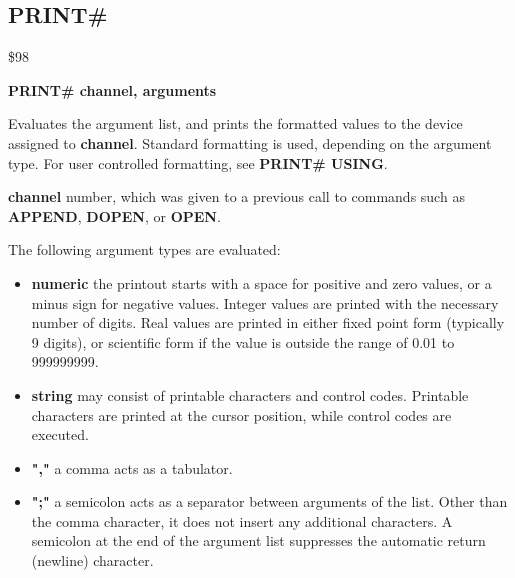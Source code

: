 
\newpage
\subsection{PRINT\#}
\begin{description}[leftmargin=2cm,style=nextline]
\item [Token:] \$98
\item [Format:] {\bf PRINT\# channel, arguments}
\item [Usage:]  Evaluates the argument list, and prints the formatted
                values to the device assigned to {\bf channel}.
                Standard formatting is used, depending on the
                argument type. For user controlled formatting,
                see {\bf PRINT\# USING}.

                {\bf channel} number, which was given to a previous
                call to commands such as {\bf APPEND}, {\bf DOPEN}, or {\bf OPEN}.

                The following argument types are evaluated:
                \begin{itemize}
                    \item {\bf numeric} the printout starts with a space
                    for positive and zero values, or a minus sign for
                    negative values. Integer values are printed with
                    the necessary number of digits. Real values are
                    printed in either fixed point form (typically
                    9 digits), or scientific form if the value is
                    outside the range of 0.01 to 999999999.

                    \item {\bf string} may consist of printable
                    characters and control codes. Printable characters
                    are printed at the cursor position, while control
                    codes are executed.

                    \item {\bf ","} a comma acts as a tabulator.

                    \item {\bf ";"} a semicolon acts as a separator between
                    arguments of the list. Other than the comma character,
                    it does not insert any additional characters.
                    A semicolon at the end of the argument list suppresses
                    the automatic return (newline) character.
                \end{itemize}


\end{description}
